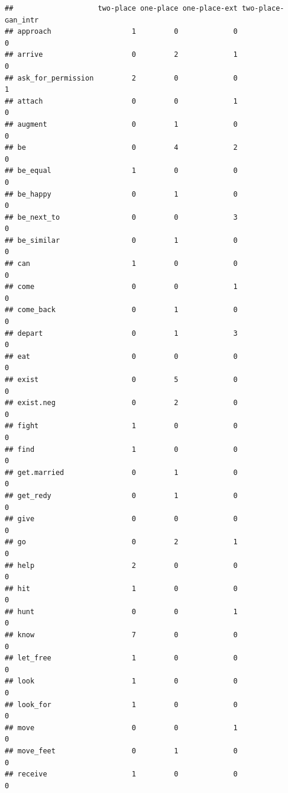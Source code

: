 \documentclass[
]{article}
\begin{document}
\begin{verbatim}
##                    two-place one-place one-place-ext two-place-ɢan_intr
## approach                   1         0             0                  0
## arrive                     0         2             1                  0
## ask_for_permission         2         0             0                  1
## attach                     0         0             1                  0
## augment                    0         1             0                  0
## be                         0         4             2                  0
## be_equal                   1         0             0                  0
## be_happy                   0         1             0                  0
## be_next_to                 0         0             3                  0
## be_similar                 0         1             0                  0
## can                        1         0             0                  0
## come                       0         0             1                  0
## come_back                  0         1             0                  0
## depart                     0         1             3                  0
## eat                        0         0             0                  0
## exist                      0         5             0                  0
## exist.neg                  0         2             0                  0
## fight                      1         0             0                  0
## find                       1         0             0                  0
## get.married                0         1             0                  0
## get_redy                   0         1             0                  0
## give                       0         0             0                  0
## go                         0         2             1                  0
## help                       2         0             0                  0
## hit                        1         0             0                  0
## hunt                       0         0             1                  0
## know                       7         0             0                  0
## let_free                   1         0             0                  0
## look                       1         0             0                  0
## look_for                   1         0             0                  0
## move                       0         0             1                  0
## move_feet                  0         1             0                  0
## receive                    1         0             0                  0

\end{verbatim}
\end{document}
